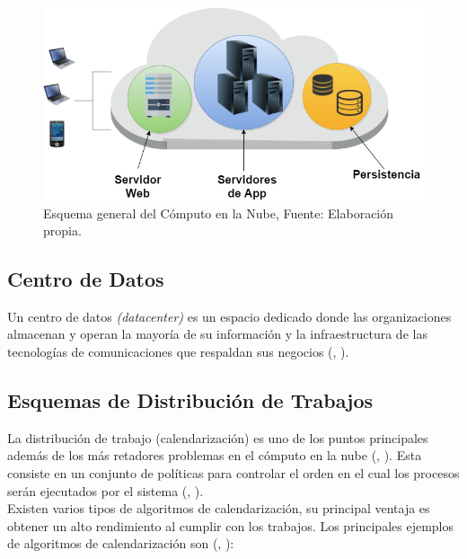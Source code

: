 \newpage

\setcounter{figure}{1}
\renewcommand\thefigure{\arabic{figure}}
\begin{figure}
	\centering
	\includegraphics[scale=0.5]{media/cloud1}
	\caption{Esquema general del C\'omputo en la Nube, Fuente: Elaboraci\'on propia.}
\end{figure}


\subsection*{Centro de Datos}
Un centro de datos \textit{(datacenter)} es un espacio dedicado donde las organizaciones almacenan y operan la mayor\'ia de su informaci\'on y la infraestructura de las tecnolog\'ias de comunicaciones que respaldan sus negocios (\citeauthor{whatisdatacenter}, \citeyear{whatisdatacenter}).

\subsection*{Esquemas de Distribuci\'on de Trabajos}

La distribuci\'on de trabajo (calendarizaci\'on) es uno de los puntos principales adem\'as de los m\'as retadores problemas en el c\'omputo en la nube (\citeauthor{li2014greedy}, \citeyear{li2014greedy}). Esta consiste en un conjunto de pol\'iticas para controlar el orden en el cual los procesos ser\'an ejecutados por el sistema (\citeauthor{agarwal2014efficient}, \citeyear{agarwal2014efficient}).\\

Existen varios tipos de algoritmos de calendarizaci\'on, su principal ventaja es obtener un alto rendimiento al cumplir con los trabajos. Los principales ejemplos de algoritmos de calendarizaci\'on son (\citeauthor{salot2013survey}, \citeyear{salot2013survey}):

